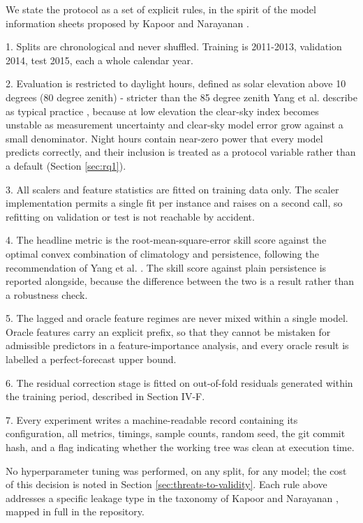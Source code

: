 We state the protocol as a set of explicit rules, in the spirit of the
model information sheets proposed by Kapoor and Narayanan
\cite{kapoor2023leakage}.

1. Splits are chronological and never shuffled. Training is 2011-2013,
   validation 2014, test 2015, each a whole calendar year.

2. Evaluation is restricted to daylight hours, defined as solar
   elevation above 10 degrees (80 degree zenith) - stricter than the 85
   degree zenith Yang et al. describe as typical practice
   \cite{yang2020verification}, because at low elevation the clear-sky
   index becomes unstable as measurement uncertainty and clear-sky
   model error grow against a small denominator. Night hours contain
   near-zero power that every model predicts correctly, and their
   inclusion is treated as a protocol variable rather than a default
   (Section \ref{sec:rq1}).

3. All scalers and feature statistics are fitted on training data only.
   The scaler implementation permits a single fit per instance and
   raises on a second call, so refitting on validation or test is not
   reachable by accident.

4. The headline metric is the root-mean-square-error skill score against
   the optimal convex combination of climatology and persistence,
   following the recommendation of Yang et al. \cite{yang2020verification}. The skill score
   against plain persistence is reported alongside, because the
   difference between the two is a result rather than a robustness
   check.

5. The lagged and oracle feature regimes are never mixed within a
   single model. Oracle features carry an explicit prefix, so that they
   cannot be mistaken for admissible predictors in a feature-importance
   analysis, and every oracle result is labelled a perfect-forecast
   upper bound.

6. The residual correction stage is fitted on out-of-fold residuals
   generated within the training period, described in Section IV-F.

7. Every experiment writes a machine-readable record containing its
   configuration, all metrics, timings, sample counts, random seed, the
   git commit hash, and a flag indicating whether the working tree was
   clean at execution time.

No hyperparameter tuning was performed, on any split, for any model;
the cost of this decision is noted in Section
\ref{sec:threats-to-validity}. Each rule above addresses a specific
leakage type in the taxonomy of Kapoor and Narayanan
\cite{kapoor2023leakage}, mapped in full in the repository.

